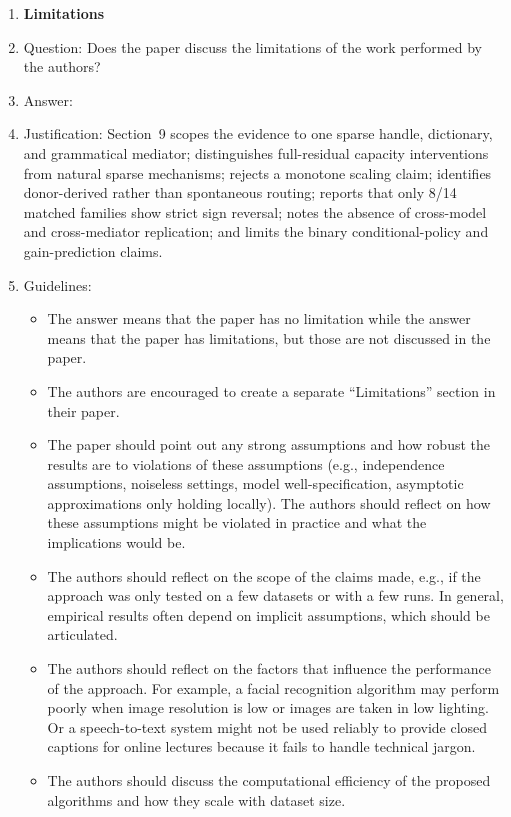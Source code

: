 \documentclass[
]{article}
\begin{document}
\begin{enumerate}
\item {\bf Limitations}
    \item[] Question: Does the paper discuss the limitations of the work performed by the authors?
    \item[] Answer: \answerYes{} %
    \item[] Justification: Section~9 scopes the evidence to one sparse handle, dictionary, and grammatical mediator; distinguishes full-residual capacity interventions from natural sparse mechanisms; rejects a monotone scaling claim; identifies donor-derived rather than spontaneous routing; reports that only 8/14 matched families show strict sign reversal; notes the absence of cross-model and cross-mediator replication; and limits the binary conditional-policy and gain-prediction claims.
    \item[] Guidelines:
    \begin{itemize}
        \item The answer \answerNA{} means that the paper has no limitation while the answer \answerNo{} means that the paper has limitations, but those are not discussed in the paper. 
        \item The authors are encouraged to create a separate ``Limitations'' section in their paper.
        \item The paper should point out any strong assumptions and how robust the results are to violations of these assumptions (e.g., independence assumptions, noiseless settings, model well-specification, asymptotic approximations only holding locally). The authors should reflect on how these assumptions might be violated in practice and what the implications would be.
        \item The authors should reflect on the scope of the claims made, e.g., if the approach was only tested on a few datasets or with a few runs. In general, empirical results often depend on implicit assumptions, which should be articulated.
        \item The authors should reflect on the factors that influence the performance of the approach. For example, a facial recognition algorithm may perform poorly when image resolution is low or images are taken in low lighting. Or a speech-to-text system might not be used reliably to provide closed captions for online lectures because it fails to handle technical jargon.
        \item The authors should discuss the computational efficiency of the proposed algorithms and how they scale with dataset size.

\end{itemize}
\end{enumerate}
\end{document}
